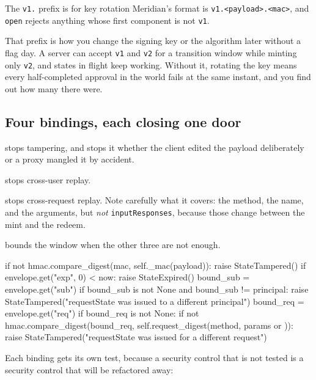 \begin{notebox}{The \texttt{v1.} prefix is for key rotation}
Meridian's format is \texttt{v1.<payload>.<mac>}, and \texttt{open} rejects
anything whose first component is not \texttt{v1}.

That prefix is how you change the signing key or the algorithm later without a
flag day. A server can accept \texttt{v1} and \texttt{v2} for a transition
window while minting only \texttt{v2}, and states in flight keep working.
Without it, rotating the key means every half-completed approval in the world
fails at the same instant, and you find out how many there were.
\end{notebox}

\subsection{Four bindings, each closing one door}

\begin{description}[leftmargin=1.4em, style=nextline, itemsep=3pt]
\item[The MAC] stops tampering, and stops it whether the client edited the
payload deliberately or a proxy mangled it by accident.
\item[\texttt{sub}, the principal] stops cross-user replay.
\item[\texttt{req}, a request digest] stops cross-request replay. Note carefully
what it covers: the method, the name, and the arguments, but \emph{not}
\texttt{inputResponses}, because those change between the mint and the redeem.
\item[\texttt{exp}] bounds the window when the other three are not enough.
\end{description}

\begin{py}
if not hmac.compare_digest(mac, self._mac(payload)):
    raise StateTampered()
if envelope.get("exp", 0) < now:
    raise StateExpired()
bound_sub = envelope.get("sub")
if bound_sub is not None and bound_sub != principal:
    raise StateTampered("requestState was issued to a different principal")
bound_req = envelope.get("req")
if bound_req is not None:
    if not hmac.compare_digest(bound_req,
                               self.request_digest(method, params or {})):
        raise StateTampered("requestState was issued for a different request")
\end{py}

Each binding gets its own test, because a security control that is not tested is
a security control that will be refactored away:

